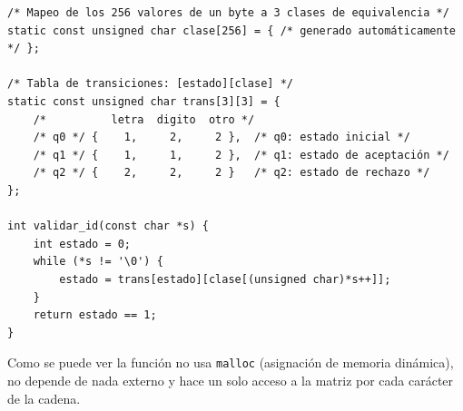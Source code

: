 \documentclass[runningheads]{llncs}
\begin{document}
\begin{lstlisting}[style=cstyle]
/* Mapeo de los 256 valores de un byte a 3 clases de equivalencia */
static const unsigned char clase[256] = { /* generado automáticamente */ };

/* Tabla de transiciones: [estado][clase] */
static const unsigned char trans[3][3] = {
    /*          letra  digito  otro */
    /* q0 */ {    1,     2,     2 },  /* q0: estado inicial */
    /* q1 */ {    1,     1,     2 },  /* q1: estado de aceptación */
    /* q2 */ {    2,     2,     2 }   /* q2: estado de rechazo */
};

int validar_id(const char *s) {
    int estado = 0;
    while (*s != '\0') {
        estado = trans[estado][clase[(unsigned char)*s++]];
    }
    return estado == 1;
}
\end{lstlisting}

Como se puede ver la función no usa \texttt{malloc} (asignación de memoria dinámica), no depende de nada externo y hace un solo acceso a la matriz por cada carácter de la cadena.

\end{document}

